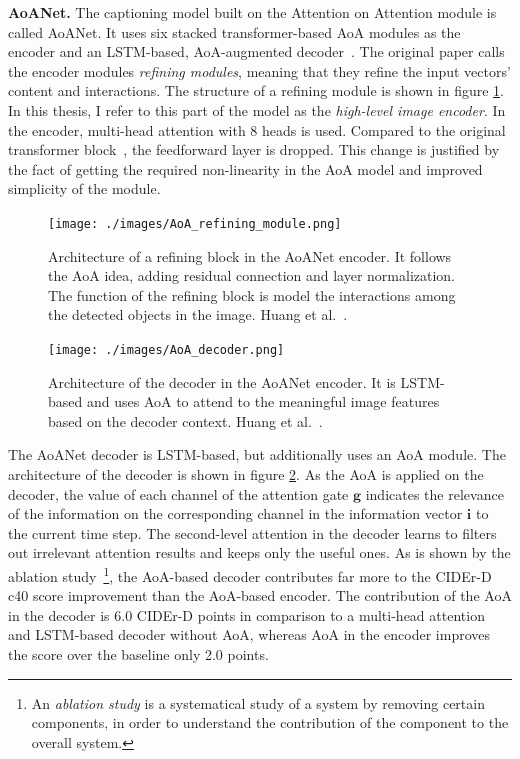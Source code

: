 \documentclass[english,twoside,openright]{HYgraduMLDS}
\newcommand{\vect}[1]{\bm{#1}}
\begin{document}
\textbf{AoANet.} The captioning model built on the Attention on Attention module is called AoANet. It uses six stacked transformer-based AoA modules as the encoder and an LSTM-based, AoA-augmented decoder~\cite{AoA}. The original paper calls the encoder modules \textit{refining modules}, meaning that they refine the input vectors' content and interactions. The structure of a refining module is shown in figure \ref{fig:AoA_refining}. In this thesis, I refer to this part of the model as the \textit{high-level image encoder}. In the encoder, multi-head attention with 8 heads is used. Compared to the original transformer block~\cite{Attention}, the feedforward layer is dropped. This change is justified by the fact of getting the required non-linearity in the AoA model and improved simplicity of the module.

\begin{figure}[h] 
\centering
\texttt{[image: ./images/AoA\_refining\_module.png]}
\caption{Architecture of a refining block in the AoANet encoder. It follows the AoA idea, adding residual connection and layer normalization. The function of the refining block is model the interactions among the detected objects in the image. Huang et al.~\cite{AoA}.}
\label{fig:AoA_refining} 
\end{figure}

\begin{figure}[h] 
\centering
\texttt{[image: ./images/AoA\_decoder.png]}
\caption{Architecture of the decoder in the AoANet encoder. It is LSTM-based and uses AoA to attend to the meaningful image features based on the decoder context. Huang et al.~\cite{AoA}.}
\label{fig:AoA_decoder} 
\end{figure}

The AoANet decoder is LSTM-based, but additionally uses an AoA module. The architecture of the decoder is shown in figure \ref{fig:AoA_decoder}. As the AoA is applied on the decoder, the value of each channel of the attention gate $\vect{g}$ indicates the relevance of the information on the corresponding channel in the information vector $\vect{i}$ to the current time step. The second-level attention in the decoder learns to filters out irrelevant attention results and keeps only the useful ones. As is shown by the ablation study~\cite{AoA}\footnote{An \textit{ablation study} is a systematical study of a system by removing certain components, in order to understand the contribution of the component to the overall system.}, the AoA-based decoder contributes far more to the CIDEr-D c40 score improvement than the AoA-based encoder. The contribution of the AoA in the decoder is 6.0 CIDEr-D points in comparison to a multi-head attention and LSTM-based decoder without AoA, whereas AoA in the encoder improves the score over the baseline only 2.0 points. 
\end{document}
